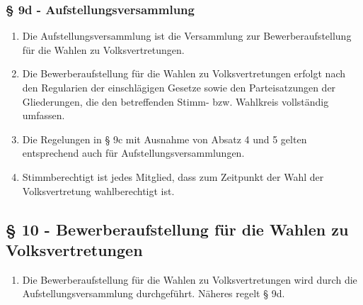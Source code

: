 \documentclass[draft,a4paper,10pt]{article}
\begin{document}
\subsubsection{§ 9d - Aufstellungsversammlung}
\begin{enumerate}
\item Die Aufstellungsversammlung ist die Versammlung zur Bewerberaufstellung
für die Wahlen zu Volksvertretungen.

\item Die Bewerberaufstellung für die Wahlen zu Volksvertretungen erfolgt nach
den Regularien der einschlägigen Gesetze sowie den Parteisatzungen der
Gliederungen, die den betreffenden Stimm- bzw. Wahlkreis vollständig umfassen.

\item Die Regelungen in § 9c mit Ausnahme von Absatz 4 und 5 gelten
entsprechend auch für Aufstellungsversammlungen.

\item Stimmberechtigt ist jedes Mitglied, dass zum Zeitpunkt der Wahl der
Volksvertretung wahlberechtigt ist.
\end{enumerate}

\subsection{§ 10 - Bewerberaufstellung für die Wahlen zu Volksvertretungen}
\begin{enumerate}
\item Die Bewerberaufstellung für die Wahlen zu Volksvertretungen wird durch die
Aufstellungsversammlung durchgeführt. Näheres regelt § 9d.
\end{enumerate}
\end{document}
